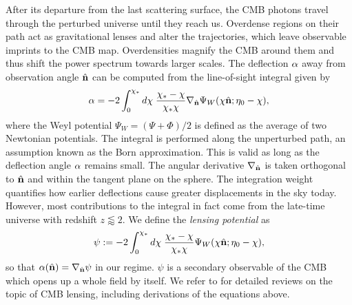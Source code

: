 After its departure from the last scattering surface, the CMB photons travel through the perturbed universe until they reach us. Overdense regions on their path act as gravitational lenses and alter the trajectories, which leave observable imprints to the CMB map. Overdensities magnify the CMB around them and thus shift the power spectrum towards larger scales. The deflection $\mathbf{\alpha}$ away from observation angle $\hat{\mathbf{n}}$ can be computed from the line-of-sight integral given by 
\begin{align}
	\mathbf{\alpha} = - 2\int_0^{\chi_*} d\chi \; \frac{\chi_* - \chi}{\chi_* \chi} \nabla_{\hat{\mathbf{n}}} \Psi_W (\chi\hat{\mathbf{n}}; \eta_0-\chi), 
\end{align}
where the Weyl potential $\Psi_W = (\Psi + \Phi)/2$ is defined as the average of two Newtonian potentials. The integral is performed along the unperturbed path, an assumption known as the Born approximation. This is valid as long as the deflection angle $\mathbf{\alpha}$ remains small. The angular derivative $\nabla_{\hat{\mathbf{n}}}$ is taken orthogonal to $\hat{\mathbf{n}}$ and within the tangent plane on the sphere. The integration weight quantifies how earlier deflections cause greater displacements in the sky today. However, most contributions to the integral in fact come from the late-time universe with redshift $z\lessapprox2$. We define the \textit{lensing potential} as
\begin{align}
	\psi := - 2\int_0^{\chi_*} d\chi \; \frac{\chi_* - \chi}{\chi_* \chi}  \Psi_W (\chi\hat{\mathbf{n}}; \eta_0-\chi), \label{def:lensing_potential}
\end{align}
so that $\mathbf{\alpha}(\hat{\mathbf{n}}) = \nabla_{\hat{\mathbf{n}}} \psi$ in our regime. $\psi$ is a secondary observable of the CMB which opens up a whole field by itself. We refer to \cite{Bartelmann2001weaklensing,Lewis2006weaklensing,Hanson2010weaklensing} for detailed reviews on the topic of CMB lensing, including derivations of the equations above.

